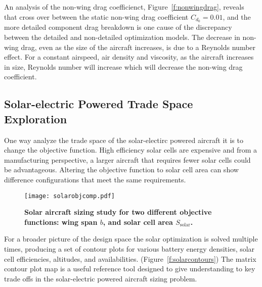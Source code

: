 \documentclass[]{aiaa-tc}%
\begin{document}
An analysis of the non-wing drag coefficienct, Figure~\ref{f:nonwingdrag}, reveals that cross over between the static non-wing drag coefficient $C_{d_0}=0.01$, and the more detailed component drag breakdown is one cause of the discrepancy between the detailed and non-detailed optimization models. 
The decrease in non-wing drag, even as the size of the aircraft increases, is due to a Reynolds number effect.  
For a constant airspeed, air density and viscosity, as the aircraft increases in size, Reynolds number will increase which will decrease the non-wing drag coefficient.

\subsection{Solar-electric Powered Trade Space Exploration}

One way analyze the trade space of the solar-electirc powered aircraft it is to change the objective function.  
High efficiency solar cells are expensive and from a manufacturing perspective, a larger aircraft that requires fewer solar cells could be advantageous.
Altering the objective function to solar cell area can show difference configurations that meet the same requirements. 

\begin{figure}[H]
	\begin{center}
	\texttt{[image: solarobjcomp.pdf]}
    \caption{\textbf{Solar aircraft sizing study for two different objective functions: wing span $b$, and solar cell area $S_{\text{solar}}$. }}
	\label{f:solarobjcomp}
	\end{center}
\end{figure}

For a broader picture of the design space the solar optimization is solved multiple times, producing a set of contour plots for various battery energy densities, solar cell efficiencies, altitudes, and availabilities.  (Figure~\ref{f:solarcontours}) 
The matrix contour plot map is a useful reference tool designed to give understanding to key trade offs in the solar-electric powered aircraft sizing problem.
\end{document}
